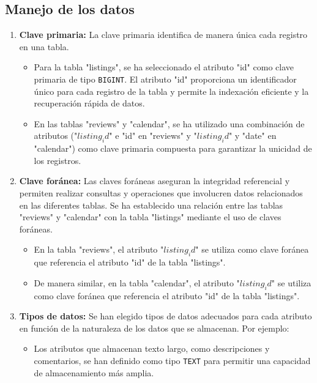 \subsection*{Manejo de los datos}
\begin{enumerate}
    \item \textbf{Clave primaria:} La clave primaria identifica de manera única cada registro en una tabla.
    \begin{itemize}
        \item Para la tabla "listings", se ha seleccionado el atributo "id" como clave primaria de tipo \texttt{BIGINT}. El atributo "id" proporciona un identificador único para cada registro de la tabla y permite la indexación eficiente y la recuperación rápida de datos.

        \item En las tablas "reviews" y "calendar", se ha utilizado una combinación de atributos ("$listing_id$" e "id" en "reviews" y "$listing_id$" y "date" en "calendar") como clave primaria compuesta para garantizar la unicidad de los registros.
    \end{itemize}
    \item \textbf{Clave foránea:} Las claves foráneas aseguran la integridad referencial y permiten realizar consultas y operaciones que involucren datos relacionados en las diferentes tablas. Se ha establecido una relación entre las tablas "reviews" y "calendar" con la tabla "listings" mediante el uso de claves foráneas. 
    \begin{itemize}
        \item En la tabla "reviews", el atributo "$listing_id$" se utiliza como clave foránea que referencia el atributo "id" de la tabla "listings".

        \item De manera similar, en la tabla "calendar", el atributo "$listing_id$" se utiliza como clave foránea que referencia el atributo "id" de la tabla "listings".
    \end{itemize}
    
    \item \textbf{Tipos de datos:} Se han elegido tipos de datos adecuados para cada atributo en función de la naturaleza de los datos que se almacenan. Por ejemplo:
    \begin{itemize}
        \item Los atributos que almacenan texto largo, como descripciones y comentarios, se han definido como tipo \texttt{TEXT} para permitir una capacidad de almacenamiento más amplia.


\end{itemize}
\end{enumerate}
